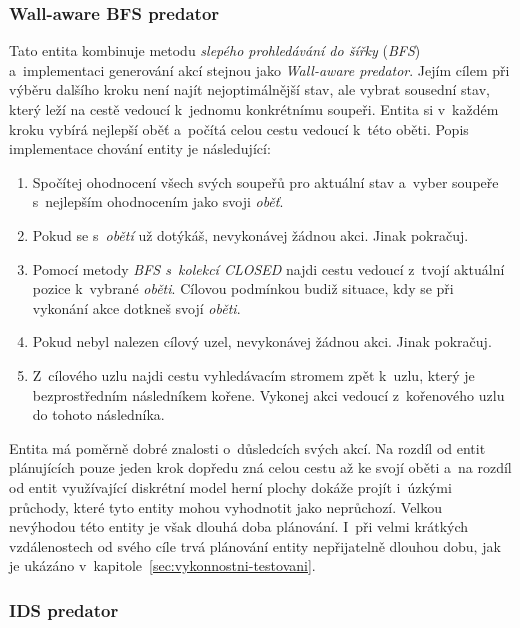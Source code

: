 \subsubsection*{Wall-aware BFS predator}

Tato entita kombinuje metodu \emph{slepého prohledávání do šířky} (\emph{BFS}) a~implementaci generování akcí stejnou jako \emph{Wall-aware predator}. Jejím cílem při výběru dalšího kroku není najít nejoptimálnější stav, ale vybrat sousední stav, který leží na cestě vedoucí k~jednomu konkrétnímu soupeři. Entita si v~každém kroku vybírá nejlepší oběť a~počítá celou cestu vedoucí k~této oběti. Popis implementace chování entity je následující:
\begin{enumerate}
    \item Spočítej ohodnocení všech svých soupeřů pro aktuální stav a~vyber soupeře s~nejlepším ohodnocením jako svoji \emph{oběť}.
    \item Pokud se s~\emph{obětí} už dotýkáš, nevykonávej žádnou akci. Jinak pokračuj.
    \item Pomocí metody \emph{BFS s~kolekcí CLOSED} najdi cestu vedoucí z~tvojí aktuální pozice k~vybrané \emph{oběti}. Cílovou podmínkou budiž situace, kdy se při vykonání akce dotkneš svojí \emph{oběti}.
    \item Pokud nebyl nalezen cílový uzel, nevykonávej žádnou akci. Jinak pokračuj.
    \item Z~cílového uzlu najdi cestu vyhledávacím stromem zpět k~uzlu, který je bezprostředním následníkem kořene. Vykonej akci vedoucí z~kořenového uzlu do tohoto následníka.
\end{enumerate}

Entita má poměrně dobré znalosti o~důsledcích svých akcí. Na rozdíl od entit plánujících pouze jeden krok dopředu zná celou cestu až ke svojí oběti a~na rozdíl od entit využívající diskrétní model herní plochy dokáže projít i~úzkými průchody, které tyto entity mohou vyhodnotit jako neprůchozí. Velkou nevýhodou této entity je však dlouhá doba plánování. I~při velmi krátkých vzdálenostech od svého cíle trvá plánování entity nepřijatelně dlouhou dobu, jak je ukázáno v~kapitole~\ref{sec:vykonnostni-testovani}.

\subsubsection*{IDS predator}

